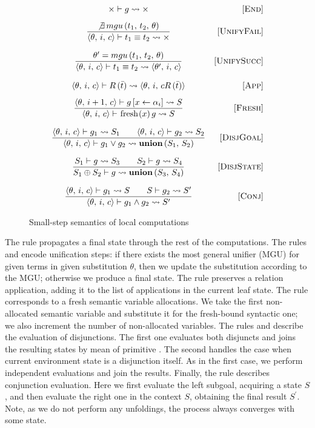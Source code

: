 \begin{figure}[t]
\[\begin{array}{cr}
{\times \vdash g \leadsto \times}
&     \ruleno{End} \\[3mm]
\dfrac{\not\exists \, mgu\,(t_1,\, t_2,\, \theta)}
      {\inbr{\theta,\, i,\, c} \vdash t_1 \equiv t_2 \leadsto \times}
&     \ruleno{UnifyFail}  \\[6mm]
\dfrac{\theta^\prime = mgu\,(t_1,\, t_2,\, \theta)}
      {\inbr{\theta,\, i,\, c} \vdash t_1 \equiv t_2 \leadsto \inbr{\theta^\prime,\, i,\, c}}
&     \ruleno{UnifySucc}  \\[6mm]
      {\inbr{\theta,\, i,\, c} \vdash R\,(\bar{t}) \leadsto \inbr{\theta,\, i,\,cR\,(\bar{t})}}
&     \ruleno{App} \\[3mm]
\dfrac{\inbr{\theta,\, i+1,\, c} \vdash g\,[x \leftarrow \alpha_i] \leadsto S}
      {\inbr{\theta,\, i,\, c} \vdash \mbox{\lstinline|fresh|} (x)\, g \leadsto S}
&     \ruleno{Fresh}  \\[6mm]
\dfrac{\inbr{\theta,\, i,\, c} \vdash g_1 \leadsto S_1 \qquad \inbr{\theta,\, i,\, c} \vdash g_2 \leadsto S_2}
      {\inbr{\theta,\, i,\, c} \vdash g_1 \lor g_2 \leadsto \primi{union}\,(S_1,\, S_2)}
&     \ruleno{DisjGoal}  \\[6mm]
\dfrac{S_1 \vdash g \leadsto S_3 \qquad S_2 \vdash g \leadsto S_4}
      {S_1 \oplus S_2 \vdash g \leadsto \primi{union}\,(S_3,\, S_4)}
&     \ruleno{DisjState}  \\[6mm]
\dfrac{\inbr{\theta,\, i,\, c} \vdash g_1 \leadsto S \qquad S \vdash g_2 \leadsto S^\prime}
      {\inbr{\theta,\, i,\, c} \vdash g_1 \land g_2 \leadsto S^\prime}
&     \ruleno{Conj}
\end{array}\]
\caption{Small-step semantics of local computations}
\label{fair:unfolding-semantics}
\end{figure}

The rule  propagates a final state through the rest of the computations. The rules  and  encode unification steps: if there exists the most general
unifier (MGU) for given terms in given substitution $\theta$, then we update the substitution according to the MGU; otherwise we produce a final state. The rule  preserves a relation
application, adding it to the list of applications in the current leaf state. The rule  corresponds to a fresh semantic variable allocations. We take the first non-allocated semantic
variable and substitute it for the fresh-bound syntactic one; we also increment the number of non-allocated variables. The rules  and  describe the evaluation
of disjunctions. The first one evaluates both disjuncts and joins the resulting states by mean of primitive . The second handles the case when current environment state is a disjunction
itself. As in the first case, we perform independent evaluations and join the results. Finally, the rule  describes conjunction evaluation. Here we first evaluate the left subgoal,
acquiring a state $S$, and then evaluate the right one in the context $S$, obtaining the final result $S^\prime$. Note, as we do not perform any unfoldings, the process always converges with
some state.

